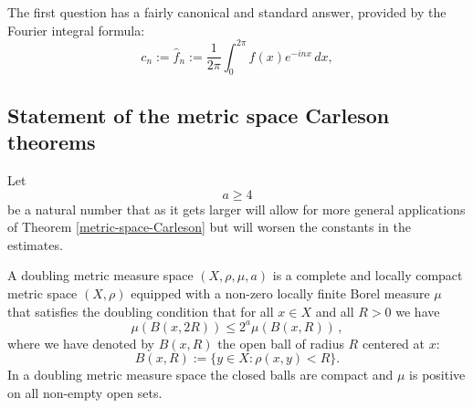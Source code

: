\documentclass[10pt,a4paper]{article}
\theoremstyle{plain}
\theoremstyle{definition}
\numberwithin{equation}{subsection}
\begin{document}
The first question has a fairly canonical and standard answer, provided by the Fourier integral formula:
\begin{equation}\label{eq:fourier-coefficients}
    c_n:=\widehat{f}_n:=\frac 1{2\pi}\int_0^{2\pi}f(x) e^{- i nx}\, dx,
\end{equation}

\subsection{Statement of the metric space Carleson theorems}

Let
\begin{equation}
    a\ge 4
\end{equation}
be a natural number that as it gets larger will allow for more general applications of Theorem \ref{metric-space-Carleson}
but will worsen the constants in the estimates.


A doubling metric measure space $(X,\rho,\mu, a)$ is a complete
and locally compact metric space $(X,\rho)$
equipped with a non-zero locally finite Borel measure $\mu$ that satisfies the doubling condition that for all $x\in X$ and all $R>0$ we have
\begin{equation}\label{doublingx}
    \mu(B(x,2R))\le 2^a\mu(B(x,R))\,,
\end{equation}
where we have denoted by $B(x,R)$ the open ball of radius $R$ centered at $x$:
\begin{equation}\label{eq-define-ball}
 B(x,R):=\{y\in X: \rho(x,y)<R\}. \end{equation}
In a doubling metric measure space the closed balls are compact and $\mu$ is positive on all non-empty open sets.
\end{document}
